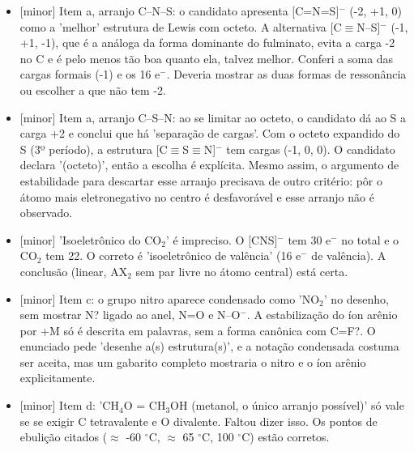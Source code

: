 \documentclass{article}%
\begin{document}
\begin{itemize}%
\item%
{[}minor{]} Item a, arranjo C--N--S: o candidato apresenta {[}C=N=S{]}$^{-}$ (-2, +1, 0) como a 'melhor' estrutura de Lewis com octeto. A alternativa {[}C$\equiv$N--S{]}$^{-}$ (-1, +1, -1), que é a análoga da forma dominante do fulminato, evita a carga -2 no C e é pelo menos tão boa quanto ela, talvez melhor. Conferi a soma das cargas formais (-1) e os 16 e$^{-}$. Deveria mostrar as duas formas de ressonância ou escolher a que não tem -2.%
\item%
{[}minor{]} Item a, arranjo C--S--N: ao se limitar ao octeto, o candidato dá ao S a carga +2 e conclui que há 'separação de cargas'. Com o octeto expandido do S (3º período), a estrutura {[}C$\equiv$S$\equiv$N{]}$^{-}$ tem cargas (-1, 0, 0). O candidato declara '(octeto)', então a escolha é explícita. Mesmo assim, o argumento de estabilidade para descartar esse arranjo precisava de outro critério: pôr o átomo mais eletronegativo no centro é desfavorável e esse arranjo não é observado.%
\item%
{[}minor{]} 'Isoeletrônico do CO$_{2}$' é impreciso. O {[}CNS{]}$^{-}$ tem 30 e$^{-}$ no total e o CO$_{2}$ tem 22. O correto é 'isoeletrônico de valência' (16 e$^{-}$ de valência). A conclusão (linear, AX$_{2}$ sem par livre no átomo central) está certa.%
\item%
{[}minor{]} Item c: o grupo nitro aparece condensado como 'NO$_{2}$' no desenho, sem mostrar N? ligado ao anel, N=O e N--O$^{-}$. A estabilização do íon arênio por +M só é descrita em palavras, sem a forma canônica com C=F?. O enunciado pede 'desenhe a(s) estrutura(s)', e a notação condensada costuma ser aceita, mas um gabarito completo mostraria o nitro e o íon arênio explicitamente.%
\item%
{[}minor{]} Item d: 'CH$_{4}$O = CH$_{3}$OH (metanol, o único arranjo possível)' só vale se se exigir C tetravalente e O divalente. Faltou dizer isso. Os pontos de ebulição citados ($\approx$ -60 $^\circ$C, $\approx$ 65 $^\circ$C, 100 $^\circ$C) estão corretos.%
\end{itemize}%
\end{document}
